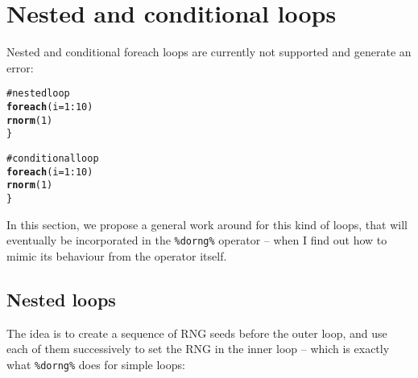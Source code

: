 \documentclass[a4paper,12pt]{article}\usepackage{graphicx, color}
\makeatletter
\newcommand{\hlfunctioncall}[1]{\textcolor[rgb]{0.501960784313725,0,0.329411764705882}{\textbf{#1}}}%
\newcommand{\hlcomment}[1]{\textcolor[rgb]{0.180392156862745,0.6,0.341176470588235}{#1}}%
\newenvironment{kframe}{%
 \def\at@end@of@kframe{}%
 \ifinner\ifhmode%
  \def\at@end@of@kframe{\end{minipage}}%
  \begin{minipage}{\columnwidth}%
 \fi\fi%
 \def\FrameCommand##1{\hskip\@totalleftmargin \hskip-\fboxsep
 \colorbox{shadecolor}{##1}\hskip-\fboxsep
     \hskip-\linewidth \hskip-\@totalleftmargin \hskip\columnwidth}%
 \MakeFramed {\advance\hsize-\width
   \@totalleftmargin\z@ \linewidth\hsize
   \@setminipage}}%
 {\par\unskip\endMakeFramed%
 \at@end@of@kframe}
\newenvironment{knitrout}{}{} %
\renewenvironment{knitrout}{\begin{footnotesize}}{\end{footnotesize}}
\let\code=\texttt
\makeatother
\begin{document}
\section{Nested and conditional loops}
\label{sec:nested}

Nested and conditional foreach loops are currently not supported and generate an error:

\begin{knitrout}
\color{fgcolor}\begin{kframe}
\begin{alltt}
\hlcomment{# nested loop}
\hlfunctioncall{foreach}(i = 1:10) %:% \hlfunctioncall{foreach}(j = 1:i) %dorng% \{
    \hlfunctioncall{rnorm}(1)
\}
\end{alltt}


{\ttfamily\noindent\bfseries\color{errorcolor}{\#\# Error: nested/conditional foreach loops are not supported yet.\\\#\# See the package's vignette for a work around.}}\begin{alltt}

\hlcomment{# conditional loop}
\hlfunctioncall{foreach}(i = 1:10) %:% \hlfunctioncall{when}(i%%2 == 0) %dorng% \{
    \hlfunctioncall{rnorm}(1)
\}
\end{alltt}


{\ttfamily\noindent\bfseries\color{errorcolor}{\#\# Error: nested/conditional foreach loops are not supported yet.\\\#\# See the package's vignette for a work around.}}\end{kframe}
\end{knitrout}


In this section, we propose a general work around for this kind of loops, that will 
eventually be incorporated in the \code{\%dorng\%} operator -- when I find out how to 
mimic its behaviour from the operator itself.

\subsection{Nested loops}

The idea is to create a sequence of RNG seeds before the outer loop, and use each 
of them successively to set the RNG in the inner loop -- which is exactly what \code{\%dorng\%} does 
for simple loops:
\end{document}
